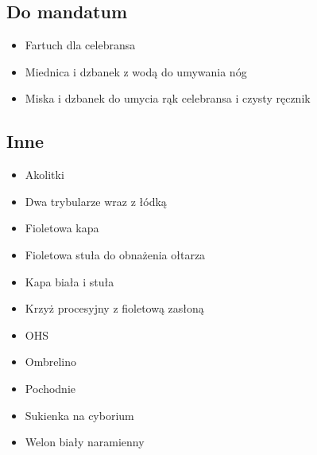 \subsection{Do mandatum}

\begin{itemize}
    \item Fartuch dla celebransa
    \item Miednica i dzbanek z wodą do umywania nóg
    \item Miska i dzbanek do umycia rąk celebransa i czysty ręcznik
\end{itemize}

\subsection{Inne}

\begin{itemize}
    \item Akolitki
    \item Dwa trybularze wraz z łódką
    \item Fioletowa kapa
    \item Fioletowa stuła do obnażenia ołtarza 
    \item Kapa biała i stuła
    \item Krzyż procesyjny z fioletową zasłoną
    \item OHS
    \item Ombrelino
    \item Pochodnie
    \item Sukienka na cyborium
    \item Welon biały naramienny
\end{itemize}
